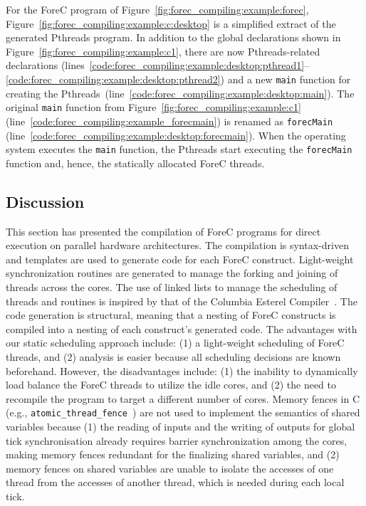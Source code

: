 For the ForeC program of Figure~\ref{fig:forec_compiling:example:forec}, 
Figure~\ref{fig:forec_compiling:example:c:desktop} is a 
simplified extract of the generated Pthreads program. 
In addition to the global declarations shown in 
Figure~\ref{fig:forec_compiling:example:c1}, there are
now Pthreads-related declarations
(lines~\ref{code:forec_compiling:example:desktop:pthread1}--\ref{code:forec_compiling:example:desktop:pthread2}) 
and a new \verb$main$ function for creating the 
Pthreads~(line~\ref{code:forec_compiling:example:desktop:main}).
The original \verb$main$ function from Figure~\ref{fig:forec_compiling:example:c1} 
(line~\ref{code:forec_compiling:example_forecmain}) 
is renamed as \verb$forecMain$ (line~\ref{code:forec_compiling:example:desktop:forecmain}).
When the operating system executes the \verb$main$
function, the Pthreads start executing the 
\verb$forecMain$ function and, hence, the statically 
allocated ForeC threads.


\subsection{Discussion}
This section has presented the compilation of ForeC
programs for direct execution on parallel hardware architectures. 
The compilation is syntax-driven and templates are
used to generate code for each ForeC construct. Light-weight
synchronization routines are generated to manage the forking
and joining of threads across the cores. The use of linked
lists to manage the scheduling of threads and routines is
inspired by that of the Columbia Esterel Compiler~\cite{timed_cec}.
The code generation
is structural, meaning that a nesting of ForeC constructs is
compiled into a nesting of each construct's generated code.
The advantages with our static scheduling approach include: 
(1) a light-weight scheduling of ForeC threads, and
(2) analysis is easier because all scheduling decisions are 
known beforehand.
However, the disadvantages include:
(1) the inability to dynamically load balance the ForeC threads 
to utilize the idle cores, and
(2) the need to recompile the program to target a different 
number of cores.
Memory fences in C (e.g.,
\texttt{atomic\_thread\_fence}~\cite{programming_languages_c11}) 
are not used to implement the semantics of shared
variables because (1) the reading of inputs and the writing
of outputs for global tick synchronisation already requires
barrier synchronization among the cores, making memory fences 
redundant for the finalizing shared variables, and (2) memory fences
on shared variables are unable to isolate the accesses of
one thread from the accesses of another thread, which is needed
during each local tick.


